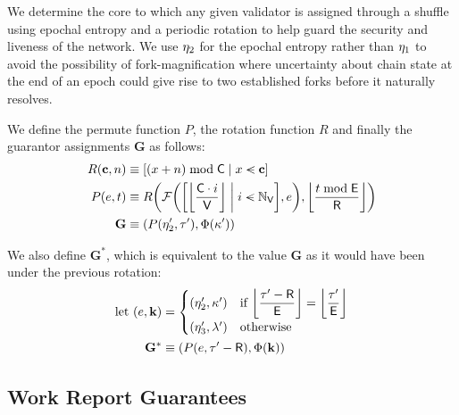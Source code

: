 We determine the core to which any given validator is assigned through a shuffle using epochal entropy and a periodic rotation to help guard the security and liveness of the network. We use $\eta_2$ for the epochal entropy rather than $\eta_1$ to avoid the possibility of fork-magnification where uncertainty about chain state at the end of an epoch could give rise to two established forks before it naturally resolves.

We define the permute function $P$, the rotation function $R$ and finally the guarantor assignments  $\mathbf{G}$ as follows:
\begin{align}
  R(\mathbf{c}, n) &\equiv \sq{\build{ (x + n) \bmod \corecount}{x \orderedin \mathbf{c}}}\\
  P(e, t) &\equiv R\left(\Ffyshuffle{\sq{\build{\ffrac{\corecount \cdot i}{\valcount}}{i \orderedin \valindex}}, e}, \ffrac{t \bmod \mathsf{E}}{\mathsf{R}}\right)\\
  \mathbf{G} &\equiv (P(\entropy_2', \thetime'), \Phi(\activeset'))
\end{align}

We also define $\mathbf{G}^*$, which is equivalent to the value $\mathbf{G}$ as it would have been under the previous rotation:
\begin{equation}
  \label{eq:priorassignments}
  \begin{aligned}
    \using (e, \mathbf{k}) &= \begin{cases}
      (\entropy'_2, \activeset') &\when \displaystyle\ffrac{\thetime' - \mathsf{R}}{\mathsf{E}} = \ffrac{\thetime'}{\mathsf{E}}\\
      (\entropy'_3, \previousset') &\otherwise
    \end{cases} \\
    \mathbf{G}^* &\equiv (P(e, \thetime' - \mathsf{R}), \Phi(\mathbf{k}))
  \end{aligned}
\end{equation}














\subsection{Work Report Guarantees}\label{sec:workreportguarantees}

